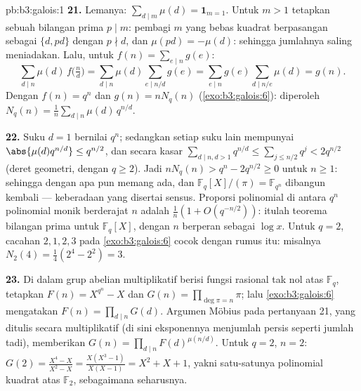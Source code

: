 \begin{solution}{pb:b3:galois:1}
\textbf{21.} Lemanya: $\sum_{d \mid m}\mu(d) = \mathbf
1_{m=1}$. Untuk $m > 1$ tetapkan sebuah bilangan prima $p \mid m$: pembagi
$m$ yang bebas kuadrat berpasangan sebagai $\{d, pd\}$ dengan $p \nmid d$,
dan $\mu(pd) = -\mu(d)$: sehingga jumlahnya saling meniadakan. Lalu, untuk $f(n) =
\sum_{e\mid n}g(e)$:
\[
\sum_{d \mid n}\mu(d)\,f\bigl(\tfrac nd\bigr)
= \sum_{d \mid n}\mu(d)\!\!\sum_{e \mid n/d}\!\!g(e)
= \sum_{e \mid n}g(e)\!\!\sum_{d \mid n/e}\!\!\mu(d)
= g(n) .
\]
Dengan $f(n) = q^n$ dan $g(n) = nN_q(n)$
(\cref{exo:b3:galois:6}): diperoleh $N_q(n) =
\frac1n\sum_{d\mid n}\mu(d)\,q^{n/d}$.

\textbf{22.} Suku $d = 1$ bernilai $q^n$; sedangkan setiap suku lain mempunyai
$\abs{\mu(d)q^{n/d}} \leq q^{n/2}$, dan secara kasar
$\sum_{d \mid n, d > 1}q^{n/d} \leq \sum_{j \leq
n/2}q^j < 2q^{n/2}$ (deret geometri, dengan $q \geq 2$). Jadi $nN_q(n) >
q^n - 2q^{n/2} \geq 0$ untuk $n \geq 1$: sehingga  dengan
 apa pun memang ada, dan $\mathbb F_q[X]/(\pi) = \mathbb F_{q^n}$
dibangun kembali --- keberadaan yang disertai sensus. Proporsi
polinomial  di antara $q^n$ polinomial monik berderajat $n$ adalah
$\frac1n(1 + O(q^{-n/2}))$: itulah teorema bilangan prima untuk
$\mathbb F_q[X]$, dengan $n$ berperan sebagai $\log x$. Untuk $q = 2$,
cacahan $2, 1, 2, 3$ pada \cref{exo:b3:galois:6} cocok dengan
rumus itu: misalnya $N_2(4) = \frac14(2^4 - 2^2) = 3$.

\textbf{23.} Di dalam grup abelian multiplikatif berisi fungsi
rasional tak nol atas $\mathbb F_q$, tetapkan $F(n) = X^{q^n} -
X$ dan $G(n) = \prod_{\deg\pi = n}\pi$; lalu
\cref{exo:b3:galois:6} mengatakan $F(n) = \prod_{d\mid n}G(d)$.
Argumen Möbius pada pertanyaan 21, yang ditulis
secara multiplikatif (di sini eksponennya menjumlah persis seperti jumlah tadi),
memberikan $G(n) = \prod_{d \mid n}F(d)^{\mu(n/d)}$. Untuk $q = 2$,
$n = 2$: $G(2) = \frac{X^4 - X}{X^2 - X} = \frac{X(X^3 -
1)}{X(X - 1)} = X^2 + X + 1$, yakni satu-satunya polinomial kuadrat
 atas $\mathbb F_2$, sebagaimana seharusnya.


\end{solution}
